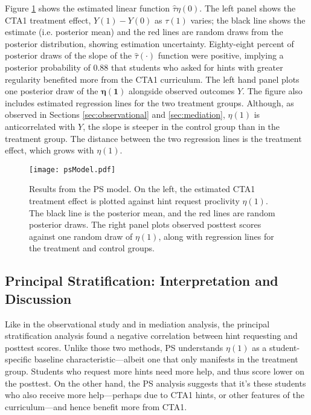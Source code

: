 \documentclass{article}
\begin{document}
Figure \ref{fig:psResults} shows the estimated linear function
$\hat{\tau}{\eta(0)}$.
The left panel shows the CTA1 treatment effect, $Y(1)-Y(0)$ as
$\tau(1)$ varies; the black line shows the estimate (i.e. posterior
mean) and the red lines are random draws from the posterior
distribution, showing estimation uncertainty.
Eighty-eight percent of posterior draws of the slope of the
$\hat{\tau}(\cdot)$ function were positive, implying a posterior
probability of 0.88 that students who asked for hints
with greater regularity benefited more from the CTA1 curriculum.
The left hand panel plots one posterior draw of the $\bm{\eta(1)}$
alongside observed outcomes $Y$.
The figure also includes estimated regression lines for the two
treatment groups.
Although, as observed in Sections \ref{sec:observational} and
\ref{sec:mediation}, $\eta(1)$ is anticorrelated with $Y$, the slope
is steeper in the control group than in the treatment group.
The distance between the two regression lines is the treatment effect,
which grows with $\eta(1)$.

\begin{figure}
\centering
\texttt{[image: psModel.pdf]}
\caption{Results from the PS model. On the left, the estimated
  CTA1 treatment effect is plotted against hint request proclivity
  $\eta(1)$. The black line is the posterior mean, and the red lines
  are random posterior draws. The right panel plots observed posttest
  scores against one random draw of $\eta(1)$, along with regression
  lines for the treatment and control groups.}
\label{fig:psResults}
\end{figure}

\subsection{Principal Stratification: Interpretation and Discussion}
Like in the observational study and in mediation analysis, the
principal stratification analysis found a negative correlation
between hint requesting and posttest scores.
Unlike those two methods, PS understands $\eta(1)$ as a
student-specific baseline characteristic---albeit one that only
manifests in the treatment group.
Students who request more hints need more help, and thus score lower
on the posttest.
On the other hand, the PS analysis suggests that it's these students
who also receive more help---perhaps due to CTA1 hints, or other
features of the curriculum---and hence benefit more from CTA1.
\end{document}
